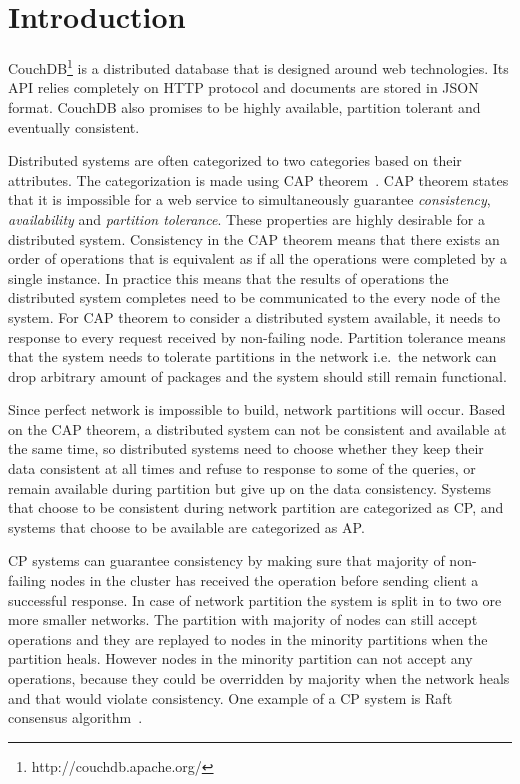 \section{Introduction}

CouchDB\footnote{http://couchdb.apache.org/} is a distributed database that is
designed around web technologies. Its API relies completely on HTTP protocol and
documents are stored in JSON format. CouchDB also promises to be highly
available, partition tolerant and eventually consistent.

Distributed systems are often categorized to two categories based on their
attributes. The categorization is made using CAP
theorem~\cite{gilbert2002brewer}. CAP theorem states that it is impossible for a
web service to simultaneously guarantee \emph{consistency}, \emph{availability}
and \emph{partition tolerance}. These properties are highly desirable for a
distributed system.  Consistency in the CAP theorem means that there exists an
order of operations that is equivalent as if all the operations were completed
by a single instance. In practice this means that the results of operations the
distributed system completes need to be communicated to the every node of the
system. For CAP theorem to consider a distributed system available, it needs to
response to every request received by non-failing node. Partition tolerance
means that the system needs to tolerate partitions in the network i.e.\ the
network can drop arbitrary amount of packages and the system should still
remain functional.

Since perfect network is impossible to build, network partitions will occur.
Based on the CAP theorem, a distributed system can not be consistent and
available at the same time, so distributed systems need to choose whether they
keep their data consistent at all times and refuse to response to some of the
queries, or remain available during partition but give up on the data
consistency. Systems that choose to be consistent during network partition are
categorized as CP, and systems that choose to be available are categorized as
AP.\

CP systems can guarantee consistency by making sure that majority of non-failing
nodes in the cluster has received the operation before sending client a
successful response. In case of network partition the system is split in to two
ore more smaller networks. The partition with majority of nodes can still accept
operations and they are replayed to nodes in the minority partitions when the
partition heals. However nodes in the minority partition can not accept any
operations, because they could be overridden by majority when the network heals
and that would violate consistency. One example of a CP system is
Raft consensus algorithm~\cite{ongaro2014search}.

